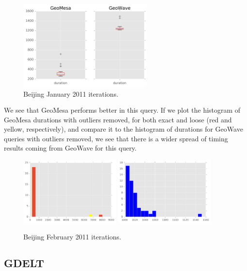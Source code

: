 \begin{figure}[h!tb]
  \centering
  \includegraphics[width=0.60\textwidth]{../docs/img/geolife-beijing-center-aug-2011.png}
  \caption{Beijing January 2011 iterations.}
  \label{beijingjan2011}
\end{figure}

We see that GeoMesa performs better in this query.
If we plot the histogram of GeoMesa durations with outliers removed,
for both exact and loose (red and yellow, respectively), and compare it to the histogram of durations for GeoWave queries with outliers removed,
we see that there is a wider spread of timing results coming from GeoWave for this query.

\begin{figure}[h!tb]
  \centering
  \includegraphics[width=0.45\textwidth]{../docs/img/geolife-beijing-center-feb-2011-bbox-gm.png}
  \includegraphics[width=0.45\textwidth]{../docs/img/geolife-beijing-center-feb-2011-bbox-gw.png}
  \caption{Beijing February 2011 iterations.}
  \label{beijingfebg2011}
\end{figure}


\subsection{GDELT}

